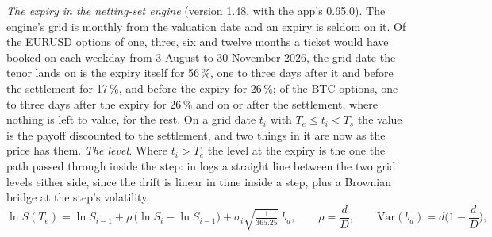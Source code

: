 \documentclass[11pt,a4paper]{article}
\begin{document}
\emph{The expiry in the netting-set engine} (version 1.48, with the app's 0.65.0). The engine's grid is monthly from the valuation date and an expiry is seldom on it. Of the EURUSD options of one, three, six and twelve months a ticket would have booked on each weekday from 3 August to 30 November 2026, the grid date the tenor lands on is the expiry itself for 56\,\%, one to three days after it and before the settlement for 17\,\%, and before the expiry for 26\,\%; of the BTC options, one to three days after the expiry for 26\,\% and on or after the settlement, where nothing is left to value, for the rest. On a grid date $t_i$ with $T_e\le t_i<T_s$ the value is the payoff discounted to the settlement, and two things in it are now as the price has them. \emph{The level.} Where $t_i>T_e$ the level at the expiry is the one the path passed through inside the step: in logs a straight line between the two grid levels either side, since the drift is linear in time inside a step, plus a Brownian bridge at the step's volatility,
\begin{equation}
\ln S(T_e)=\ln S_{i-1}+\rho\,\big(\ln S_i-\ln S_{i-1}\big)+\sigma_i\sqrt{\tfrac{1}{365.25}}\;b_d,\qquad \rho=\frac{d}{D},\qquad \mathrm{Var}(b_d)=d\Big(1-\frac{d}{D}\Big),
\end{equation}
\end{document}
